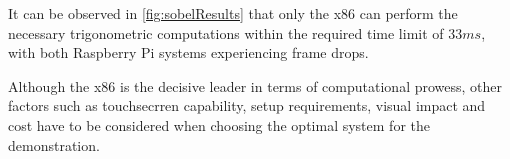 It can be observed in \cref{fig:sobelResults} that only the x86 can perform the necessary trigonometric 
computations within the required time limit of \(33ms\), with both Raspberry Pi systems experiencing frame
drops.

Although the x86 is the decisive leader in terms of computational prowess, other factors such as touchsecrren
capability, setup requirements, visual impact and cost have to be considered when choosing the optimal system
for the demonstration.

